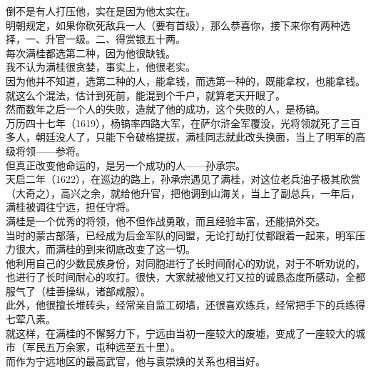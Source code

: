 \begin{multicols}{\theparacolNo}
倒不是有人打压他，实在是因为他太实在。\\

明朝规定，如果你砍死敌兵一人（要有首级），那么恭喜你，接下来你有两种选择，一、升官一级。二、得赏银五十两。\\

每次满桂都选第二种，因为他很缺钱。\\

我不认为满桂很贪婪，事实上，他很老实。\\

因为他并不知道，选第二种的人，能拿钱，而选第一种的，既能拿权，也能拿钱。\\

就这么个混法，估计到死前，能混到个千户，就算老天开眼了。\\

然而数年之后一个人的失败，造就了他的成功，这个失败的人，是杨镐。\\

万历四十七年（1619），杨镐率四路大军，在萨尔浒全军覆没，光将领就死了三百多人，朝廷没人了，只能下令破格提拔，满桂同志就此改头换面，当上了明军的高级将领——参将。\\

但真正改变他命运的，是另一个成功的人——孙承宗。\\

天启二年（1622），在巡边的路上，孙承宗遇见了满桂，对这位老兵油子极其欣赏（大奇之），高兴之余，就给他升官，把他调到山海关，当上了副总兵，一年后，满桂被调往宁远，担任守将。\\

满桂是一个优秀的将领，他不但作战勇敢，而且经验丰富，还能搞外交。\\

当时的蒙古部落，已经成为后金军队的同盟，无论打劫打仗都跟着一起来，明军压力很大，而满桂的到来彻底改变了这一切。\\

他利用自己的少数民族身份，对同胞进行了长时间耐心的劝说，对于不听劝说的，也进行了长时间耐心的攻打。很快，大家就被他又打又拉的诚恳态度所感动，全都服气了（桂善操纵，诸部咸服）。\\

此外，他很擅长堆砖头，经常亲自监工砌墙，还很喜欢练兵，经常把手下的兵练得七荤八素。\\

就这样，在满桂的不懈努力下，宁远由当初一座较大的废墟，变成了一座较大的城市（军民五万余家，屯种远至五十里）。\\

而作为宁远地区的最高武官，他与袁崇焕的关系也相当好。\\


\end{multicols}
